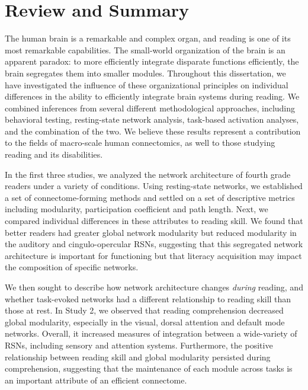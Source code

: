 \chapter{Review and Summary}

The human brain is a remarkable and complex organ, and reading is one of its most remarkable capabilities. The small-world organization of the brain is an apparent paradox: to more efficiently integrate disparate functions efficiently, the brain segregates them into smaller modules. Throughout this dissertation, we have investigated the influence of these organizational principles on individual differences in the ability to efficiently integrate brain systems during reading. We combined inferences from several different methodological approaches, including behavioral testing, resting-state network analysis, task-based activation analyses, and the combination of the two. We believe these results represent a contribution to the fields of macro-scale human connectomics, as well to those studying reading and its disabilities.

In the first three studies, we analyzed the network architecture of fourth grade readers under a variety of conditions. Using resting-state networks, we established a set of connectome-forming methods and settled on a set of descriptive metrics including modularity, participation coefficient and path length. Next, we compared individual differences in these attributes to reading skill. We found that better readers had greater global network modularity but reduced modularity in the auditory and cingulo-opercular RSNs, suggesting that this segregated network architecture is important for functioning but that literacy acquisition may impact the composition of specific networks. 

We then sought to describe how network architecture changes \textit{during} reading, and whether task-evoked networks had a different relationship to reading skill than those at rest. In Study 2, we observed that reading comprehension decreased global modularity, especially in the visual, dorsal attention and default mode networks. Overall, it increased measures of integration between a wide-variety of RSNs, including sensory and attention systems. Furthermore, the positive relationship between reading skill and global modularity persisted during comprehension, suggesting that the maintenance of each module across tasks is an important attribute of an efficient connectome. 

